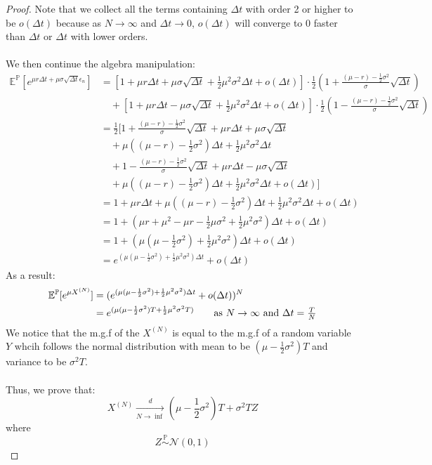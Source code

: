 \documentclass[12pt, letterpaper]{article}
\begin{document}
\begin{proof}
Note that we collect all the terms containing $\Delta t$ with order 2 or higher to be $o(\Delta t)$ because as $N\rightarrow \infty$ 
and $\Delta t \rightarrow 0$, $o(\Delta t)$ will converge to 0 faster than $\Delta t$ or $\Delta t$ with lower orders.
\\ \\ 
We then continue the algebra manipulation:
\begin{align*}
  \mathbb{E}^\mathbb{P} [e^{\mu r\Delta t+\mu\sigma \sqrt{\Delta t} \epsilon_n}] &= [1+\mu r\Delta t+\mu \sigma \sqrt{\Delta t} +\frac{1}{2}\mu^2\sigma^2\Delta t + o(\Delta t)] \cdot \frac{1}{2} (1 + \frac{(\mu -r) - \frac{1}{2}\sigma^2}{\sigma} \sqrt{\Delta t}) \\ 
    & \quad + [1+\mu r\Delta t-\mu \sigma \sqrt{\Delta t} +\frac{1}{2}\mu^2\sigma^2\Delta t + o(\Delta t)] \cdot \frac{1}{2} (1 - \frac{(\mu -r) - \frac{1}{2}\sigma^2}{\sigma} \sqrt{\Delta t}) \\
    &= \frac{1}{2}[ 1 + \frac{(\mu - r) - \frac{1}{2}\sigma^2}{\sigma}\sqrt{\Delta t} + \mu r \Delta t + \mu \sigma \sqrt{\Delta t} \\
    & \quad + \mu((\mu -r) - \frac{1}{2}\sigma^2)\Delta t + \frac{1}{2}\mu^2 \sigma^2 \Delta t \\
    & \quad + 1 - \frac{(\mu - r) - \frac{1}{2}\sigma^2}{\sigma}\sqrt{\Delta t} + \mu r \Delta t - \mu \sigma \sqrt{\Delta t} \\
    & \quad + \mu((\mu -r) - \frac{1}{2}\sigma^2)\Delta t + \frac{1}{2}\mu^2 \sigma^2 \Delta t + o(\Delta t)] \\
    &= 1 + \mu r \Delta t + \mu((\mu - r) - \frac{1}{2}\sigma^2)\Delta t + \frac{1}{2}\mu^2 \sigma^2 \Delta t + o(\Delta t) \\
    &= 1 + (\mu r + \mu^2 - \mu r -\frac{1}{2}\mu \sigma^2 + \frac{1}{2}\mu^2 \sigma^2)\Delta t + o(\Delta t) \\
    &= 1 + (\mu (\mu - \frac{1}{2}\sigma^2) + \frac{1}{2}\mu^2 \sigma^2)\Delta t + o(\Delta t)\\
    &= e^{(\mu (\mu - \frac{1}{2}\sigma^2) + \frac{1}{2}\mu^2 \sigma^2)\Delta t} + o(\Delta t)
\end{align*} 
As a result:
\begin{align*}
  \mathbb{E}^\mathbb{P}[e^{\mu X^{(N)}}] & = (e^{(\mu (\mu - \frac{1}{2}\sigma^2) + \frac{1}{2}\mu^2 \sigma^2)\Delta t} + o(\Delta t))^N\\
    &=  e^{(\mu (\mu - \frac{1}{2}\sigma^2)T + \frac{1}{2}\mu^2 \sigma^2T)} \tag*{as $N \rightarrow \infty$ and $\Delta t = \frac{T}{N}$}
\end{align*}
We notice that the m.g.f of the $X^{(N)}$ is equal to the m.g.f of a random variable $Y$ whcih follows the normal distribution with mean to be $(\mu - \frac{1}{2}\sigma^2)T$ and
variance to be $\sigma^2 T$.
\\ \\
Thus, we prove that:
\[X^{(N)} \xrightarrow[N \rightarrow \inf]{d} (\mu - \frac{1}{2}\sigma^2)T + \sigma^2 TZ\]
where 
\[Z \stackrel{\mathbb{P}}{\sim} \mathcal{N}(0, 1)\] 
\end{proof}
\end{document}
